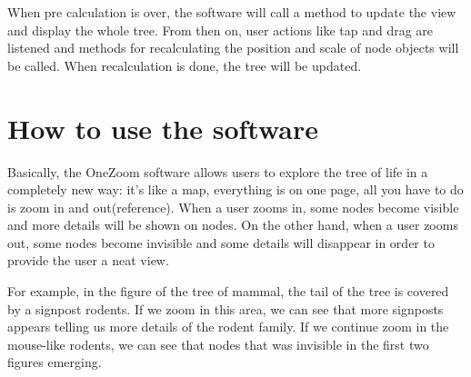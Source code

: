 \documentclass[MSc]{icldt}
\begin{document}
When pre calculation is over, the software will call a method to update the view and display the whole tree. From then on, user actions like tap and drag are listened and methods for recalculating the position and scale of node objects will be called. When recalculation is done, the tree will be updated. 



\section{How to use the software}
Basically, the OneZoom software allows users to explore the tree of life in a completely new way: it's like a map, everything is on one page, all you have to do is zoom in and out(reference). When a user zooms in, some nodes become visible and more details will be shown on nodes. On the other hand, when a user zooms out, some nodes become invisible and some details will disappear in order to provide the user a neat view. 

For example, in the figure of the tree of mammal, the tail of the tree is covered by a signpost rodents. If we zoom in this area, we can see that more signposts appears telling us more details of the rodent family. If we continue zoom in the mouse-like rodents, we can see that nodes that was invisible in the first two figures emerging.
\end{document}
